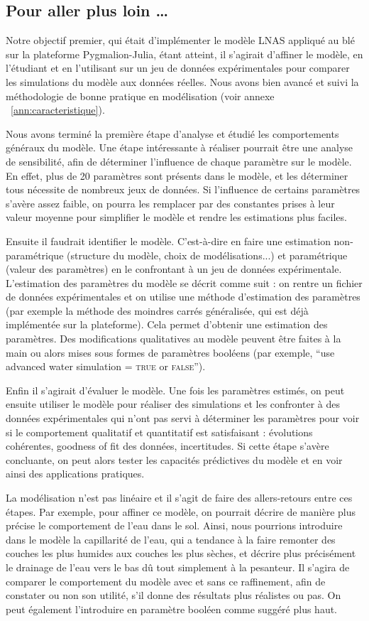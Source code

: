 \subsection{Pour aller plus loin \dots}
Notre objectif premier, qui était d'implémenter le modèle LNAS appliqué au blé sur la plateforme Pygmalion-Julia, étant atteint, il s'agirait d'affiner le modèle, en l'étudiant et en l'utilisant sur un jeu de données expérimentales pour comparer les simulations du modèle aux données réelles.
Nous avons bien avancé et suivi la méthodologie de bonne pratique en modélisation (voir annexe ~\ref{ann:caracteristique}).

Nous avons terminé la première étape d'analyse et étudié les comportements généraux du modèle.
Une étape intéressante à réaliser pourrait être une analyse de sensibilité, afin de déterminer l'influence de chaque paramètre sur le modèle. En effet, plus de 20 paramètres sont présents dans le modèle, et les déterminer tous nécessite de nombreux jeux de données. Si l'influence de certains paramètres s'avère assez faible, on pourra les remplacer par des constantes prises à leur valeur moyenne pour simplifier le modèle et rendre les estimations plus faciles.

Ensuite il faudrait identifier le modèle. C'est-à-dire en faire une estimation non-paramétrique (structure du modèle, choix de modélisations...) et paramétrique (valeur des paramètres) en le confrontant à un jeu de données expérimentale. L'estimation des paramètres du modèle se décrit comme suit : on rentre un fichier de données expérimentales et on utilise une méthode d'estimation des paramètres (par exemple la méthode des moindres carrés généralisée, qui est déjà implémentée sur la plateforme). Cela permet d'obtenir une estimation des paramètres. Des modifications qualitatives au modèle peuvent être faites à la main ou alors mises sous formes de paramètres booléens (par exemple, ``use advanced water simulation = \textsc{true} or \textsc{false}'').

Enfin il s'agirait d'évaluer le modèle. Une fois les paramètres estimés, on peut ensuite utiliser le modèle pour réaliser des simulations et les confronter à des données expérimentales qui n'ont pas servi à déterminer les paramètres pour voir si le comportement qualitatif et quantitatif est satisfaisant : évolutions cohérentes, goodness of fit des données, incertitudes.
Si cette étape s'avère concluante, on peut alors tester les capacités prédictives du modèle
et en voir ainsi des applications pratiques.

La modélisation n'est pas linéaire et il s'agit de faire des allers-retours entre ces étapes. Par exemple, pour affiner ce modèle, on pourrait décrire de manière plus précise le comportement de l'eau dans le sol. Ainsi, nous pourrions introduire dans le modèle la capillarité de l'eau, qui a tendance à la faire remonter des couches les plus humides aux couches les plus sèches, et décrire plus précisément le drainage de l'eau vers le bas dû tout simplement à la pesanteur. Il s'agira de comparer le comportement du modèle avec et sans ce raffinement, afin de constater ou non son utilité, s'il donne des résultats plus réalistes ou pas. On peut également 
l'introduire en paramètre booléen comme suggéré plus haut.